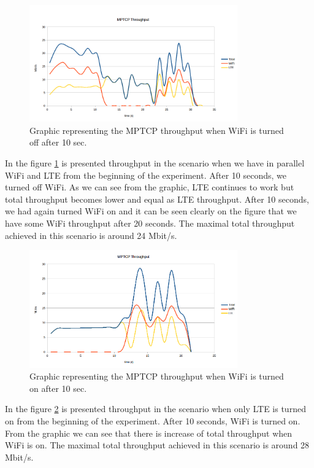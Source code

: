 \documentclass{llncs}
\begin{document}
\begin{figure}[H]
\centering
\includegraphics[width=0.8\textwidth]{result1.png}
\caption{\label{fig:r1} Graphic representing the MPTCP throughput when WiFi is turned off after 10 sec.}
\end{figure}

In the figure \ref{fig:r1} is presented throughput in the scenario when we have in parallel WiFi and LTE from the beginning of the experiment. After 10 seconds, we turned off WiFi. As we can see from the graphic, LTE continues to work but total throughput becomes lower and equal as LTE throughput. After 10 seconds, we had again turned WiFi on and it can be seen clearly on the figure that we have some WiFi throughput after 20 seconds. The maximal total throughput achieved in this scenario is around 24 Mbit/s.

\begin{figure}[H]
\centering
\includegraphics[width=0.8\textwidth]{result2.png}
\caption{\label{fig:r2} Graphic representing the MPTCP throughput when WiFi is turned on after 10 sec.}
\end{figure}

In the figure \ref{fig:r2} is presented throughput in the scenario when only LTE is turned on from the beginning of the experiment. After 10 seconds, WiFi is turned on. From the graphic we can see that there is increase of total throughput when WiFi is on. The maximal total throughput achieved in this scenario is around 28 Mbit/s.
\end{document}
